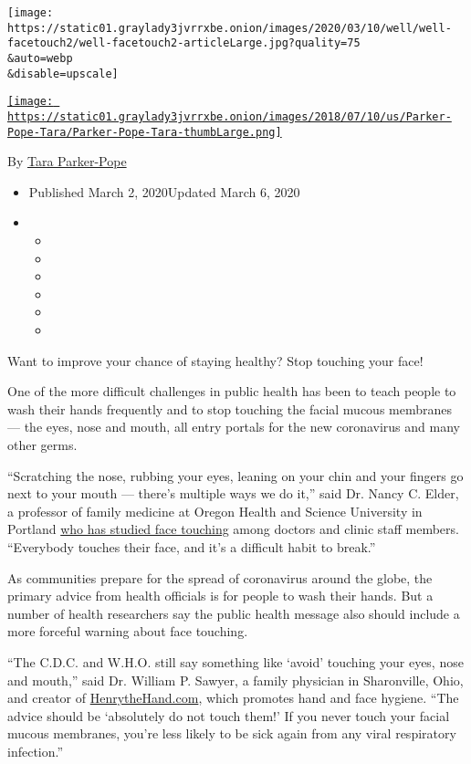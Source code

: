 \texttt{[image: https://static01.graylady3jvrrxbe.onion/images/2020/03/10/well/well-facetouch2/well-facetouch2-articleLarge.jpg?quality=75\\\&auto=webp\\\&disable=upscale]}

\href{https://www.nytimes3xbfgragh.onion/by/tara-parker-pope}{\texttt{[image: https://static01.graylady3jvrrxbe.onion/images/2018/07/10/us/Parker-Pope-Tara/Parker-Pope-Tara-thumbLarge.png]}}

By \href{https://www.nytimes3xbfgragh.onion/by/tara-parker-pope}{Tara
Parker-Pope}

\begin{itemize}
\item
  Published March 2, 2020Updated March 6, 2020
\item
  \begin{itemize}
  \item
  \item
  \item
  \item
  \item
  \item
  \end{itemize}
\end{itemize}

Want to improve your chance of staying healthy? Stop touching your face!

One of the more difficult challenges in public health has been to teach
people to wash their hands frequently and to stop touching the facial
mucous membranes --- the eyes, nose and mouth, all entry portals for the
new coronavirus and many other germs.

``Scratching the nose, rubbing your eyes, leaning on your chin and your
fingers go next to your mouth --- there's multiple ways we do it,'' said
Dr. Nancy C. Elder, a professor of family medicine at Oregon Health and
Science University in Portland
\href{https://www.ncbi.nlm.nih.gov/pubmed/24808112}{who has studied face
touching} among doctors and clinic staff members. ``Everybody touches
their face, and it's a difficult habit to break.''

As communities prepare for the spread of coronavirus around the globe,
the primary advice from health officials is for people to wash their
hands. But a number of health researchers say the public health message
also should include a more forceful warning about face touching.

``The C.D.C. and W.H.O. still say something like `avoid' touching your
eyes, nose and mouth,'' said Dr. William P. Sawyer, a family physician
in Sharonville, Ohio, and creator of
\href{https://www.henrythehand.com/}{HenrytheHand.com}, which promotes
hand and face hygiene. ``The advice should be `absolutely do not touch
them!' If you never touch your facial mucous membranes, you're less
likely to be sick again from any viral respiratory infection.''

